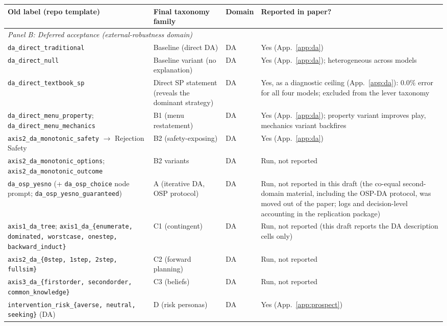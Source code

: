 \begin{table}[p]
\centering
\footnotesize
\setlength{\tabcolsep}{4pt}
\begin{tabular}{p{4.9cm} p{3.3cm} p{1.0cm} p{4.4cm}}
\toprule
\textbf{Old label (repo template)} & \textbf{Final taxonomy family} & \textbf{Domain} & \textbf{Reported in paper?} \\
\midrule
\multicolumn{4}{l}{\emph{Panel B: Deferred acceptance (external-robustness domain)}} \\
\midrule
\texttt{da\_direct\_traditional} & Baseline (direct DA) & DA & Yes (App.~\ref{app:da}) \\
\texttt{da\_direct\_null} & Baseline variant (no explanation) & DA & Yes (App.~\ref{app:da}); heterogeneous across models \\
\texttt{da\_direct\_textbook\_sp} & Direct SP statement (reveals the dominant strategy) & DA & Yes, as a diagnostic ceiling (App.~\ref{app:da}): $0.0\%$ error for all four models; excluded from the lever taxonomy \\
\texttt{da\_direct\_menu\_property}; \texttt{da\_direct\_menu\_mechanics} & B1 (menu restatement) & DA & Yes (App.~\ref{app:da}); property variant improves play, mechanics variant backfires \\
\texttt{axis2\_da\_monotonic\_safety} $\to$ Rejection Safety & B2 (safety-exposing) & DA & Yes (App.~\ref{app:da}) \\
\texttt{axis2\_da\_monotonic\_options}; \texttt{axis2\_da\_monotonic\_outcome} & B2 variants & DA & Run, not reported \\
\texttt{da\_osp\_yesno} (+ \texttt{da\_osp\_choice} node prompt; \texttt{da\_osp\_yesno\_guaranteed}) & A (iterative DA, OSP protocol) & DA & Run, not reported in this draft (the co-equal second-domain material, including the OSP-DA protocol, was moved out of the paper; logs and decision-level accounting in the replication package) \\
\texttt{axis1\_da\_tree}; \texttt{axis1\_da\_\{enumerate, dominated, worstcase, onestep, backward\_induct\}} & C1 (contingent) & DA & Run, not reported (this draft reports the DA description cells only) \\
\texttt{axis2\_da\_\{0step, 1step, 2step, fullsim\}} & C2 (forward planning) & DA & Run, not reported \\
\texttt{axis3\_da\_\{firstorder, secondorder, common\_knowledge\}} & C3 (beliefs) & DA & Run, not reported \\
\texttt{intervention\_risk\_\{averse, neutral, seeking\}} (DA) & D (risk personas) & DA & Yes (App.~\ref{app:prospect}) \\

\end{tabular}
\end{table}
